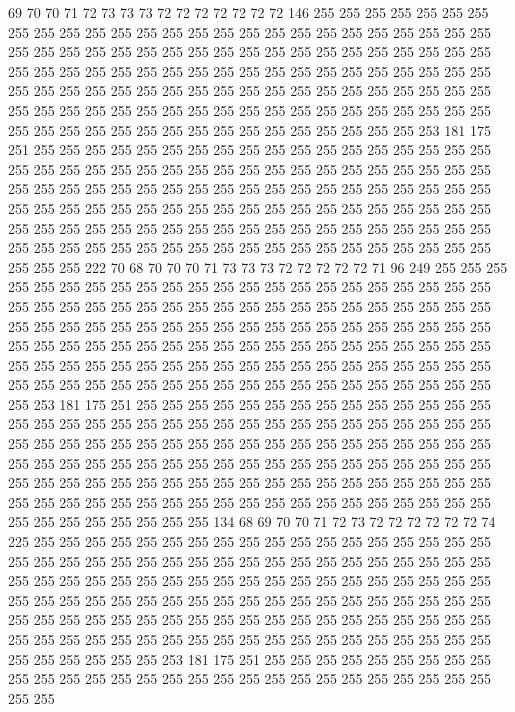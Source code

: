 69 70 70 71 72 73 73 73 72 72 72 72 72 72 72 146 255 255 255 255
255 255 255 255 255 255 255 255 255 255 255 255 255 255 255 255 255 255 255 255
255 255 255 255 255 255 255 255 255 255 255 255 255 255 255 255 255 255 255 255
255 255 255 255 255 255 255 255 255 255 255 255 255 255 255 255 255 255 255 255
255 255 255 255 255 255 255 255 255 255 255 255 255 255 255 255 255 255 255 255
255 255 255 255 255 255 255 255 255 255 255 255 255 255 255 255 255 255 255 255
255 255 255 255 255 255 255 255 255 255 255 255 255 255 253 181 175 251 255 255
255 255 255 255 255 255 255 255 255 255 255 255 255 255 255 255 255 255 255 255
255 255 255 255 255 255 255 255 255 255 255 255 255 255 255 255 255 255 255 255
255 255 255 255 255 255 255 255 255 255 255 255 255 255 255 255 255 255 255 255
255 255 255 255 255 255 255 255 255 255 255 255 255 255 255 255 255 255 255 255
255 255 255 255 255 255 255 255 255 255 255 255 255 255 255 255 255 255 255 255
255 255 255 255 255 255 255 255 255 255 255 255 255 255 222 70 68 70 70 70
71 73 73 73 72 72 72 72 72 71 96 249 255 255 255 255 255 255 255 255
255 255 255 255 255 255 255 255 255 255 255 255 255 255 255 255 255 255 255 255
255 255 255 255 255 255 255 255 255 255 255 255 255 255 255 255 255 255 255 255
255 255 255 255 255 255 255 255 255 255 255 255 255 255 255 255 255 255 255 255
255 255 255 255 255 255 255 255 255 255 255 255 255 255 255 255 255 255 255 255
255 255 255 255 255 255 255 255 255 255 255 255 255 255 255 255 255 255 255 255
255 255 255 255 255 255 255 255 255 255 253 181 175 251 255 255 255 255 255 255
255 255 255 255 255 255 255 255 255 255 255 255 255 255 255 255 255 255 255 255
255 255 255 255 255 255 255 255 255 255 255 255 255 255 255 255 255 255 255 255
255 255 255 255 255 255 255 255 255 255 255 255 255 255 255 255 255 255 255 255
255 255 255 255 255 255 255 255 255 255 255 255 255 255 255 255 255 255 255 255
255 255 255 255 255 255 255 255 255 255 255 255 255 255 255 255 255 255 255 255
255 255 255 255 255 255 255 255 255 255 255 134 68 69 70 70 71 72 73 72
72 72 72 72 72 74 225 255 255 255 255 255 255 255 255 255 255 255 255 255
255 255 255 255 255 255 255 255 255 255 255 255 255 255 255 255 255 255 255 255
255 255 255 255 255 255 255 255 255 255 255 255 255 255 255 255 255 255 255 255
255 255 255 255 255 255 255 255 255 255 255 255 255 255 255 255 255 255 255 255
255 255 255 255 255 255 255 255 255 255 255 255 255 255 255 255 255 255 255 255
255 255 255 255 255 255 255 255 255 255 255 255 255 255 255 255 255 255 255 255
255 255 255 255 255 255 253 181 175 251 255 255 255 255 255 255 255 255 255 255
255 255 255 255 255 255 255 255 255 255 255 255 255 255 255 255 255 255 255 255
